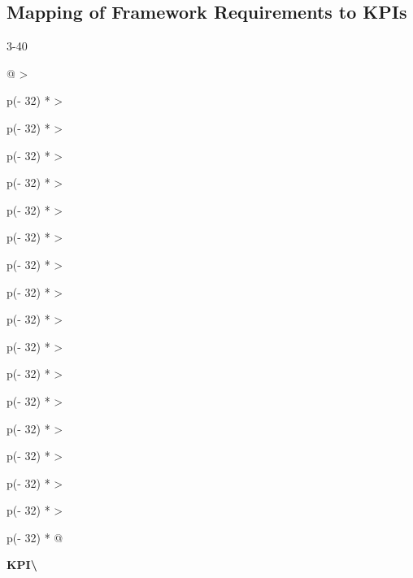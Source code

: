 \hypertarget{mapping-of-framework-requirements-to-kpis}{%
\subsection{Mapping of Framework Requirements to KPIs}\label{mapping-of-framework-requirements-to-kpis}}

\begin{wptable}{3-40}\footnotesize

\begin{longtable}[]{@{}
  >{\raggedright\arraybackslash}p{(\columnwidth - 32\tabcolsep) * }
  >{\raggedright\arraybackslash}p{(\columnwidth - 32\tabcolsep) * }
  >{\raggedright\arraybackslash}p{(\columnwidth - 32\tabcolsep) * }
  >{\raggedright\arraybackslash}p{(\columnwidth - 32\tabcolsep) * }
  >{\raggedright\arraybackslash}p{(\columnwidth - 32\tabcolsep) * }
  >{\raggedright\arraybackslash}p{(\columnwidth - 32\tabcolsep) * }
  >{\raggedright\arraybackslash}p{(\columnwidth - 32\tabcolsep) * }
  >{\raggedright\arraybackslash}p{(\columnwidth - 32\tabcolsep) * }
  >{\raggedright\arraybackslash}p{(\columnwidth - 32\tabcolsep) * }
  >{\raggedright\arraybackslash}p{(\columnwidth - 32\tabcolsep) * }
  >{\raggedright\arraybackslash}p{(\columnwidth - 32\tabcolsep) * }
  >{\raggedright\arraybackslash}p{(\columnwidth - 32\tabcolsep) * }
  >{\raggedright\arraybackslash}p{(\columnwidth - 32\tabcolsep) * }
  >{\raggedright\arraybackslash}p{(\columnwidth - 32\tabcolsep) * }
  >{\raggedright\arraybackslash}p{(\columnwidth - 32\tabcolsep) * }
  >{\raggedright\arraybackslash}p{(\columnwidth - 32\tabcolsep) * }
  >{\raggedright\arraybackslash}p{(\columnwidth - 32\tabcolsep) * }@{}}
\caption{Mapping of framework requirements to project
KPIs}\tabularnewline
\toprule\noalign{}
\begin{minipage}[b]{\linewidth}\raggedright
\textbf{KPI\textbackslash{}}


\end{minipage}
\end{longtable}
\end{wptable}

